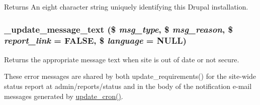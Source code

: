 \begin{DoxyReturn}{Returns}
An eight character string uniquely identifying this Drupal installation. 
\end{DoxyReturn}
\hypertarget{update_8module_aeaeb10c15564cced4147737f310a8198}{
\subsubsection[{\_\-update\_\-message\_\-text}]{\setlength{\rightskip}{0pt plus 5cm}\_\-update\_\-message\_\-text (\$ {\em msg\_\-type}, \/  \$ {\em msg\_\-reason}, \/  \$ {\em report\_\-link} = {\ttfamily FALSE}, \/  \$ {\em language} = {\ttfamily NULL})}}
\label{update_8module_aeaeb10c15564cced4147737f310a8198}
Returns the appropriate message text when site is out of date or not secure.

These error messages are shared by both update\_\-requirements() for the site-\/wide status report at admin/reports/status and in the body of the notification e-\/mail messages generated by \hyperlink{update_8module_aa03db4586231db9f453bd156d3b1f242}{update\_\-cron()}.


